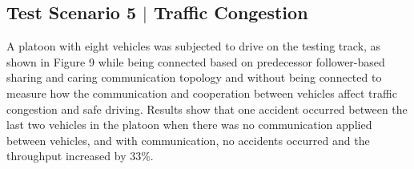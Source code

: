 \subsection{Test Scenario 5 $|$ Traffic Congestion}
A platoon with eight vehicles was subjected to drive on the testing track, as shown in Figure 9 while being connected based on predecessor follower-based sharing and caring communication topology and without being connected to measure how the communication and cooperation between vehicles affect traffic congestion and safe driving. Results show that one accident occurred between the last two vehicles in the platoon when there was no communication applied between vehicles, and with communication, no accidents occurred and the throughput increased by 33\%.

\begin{table}[H]
\centering
\caption{Number of Accidents for each test case} 
\end{table}

